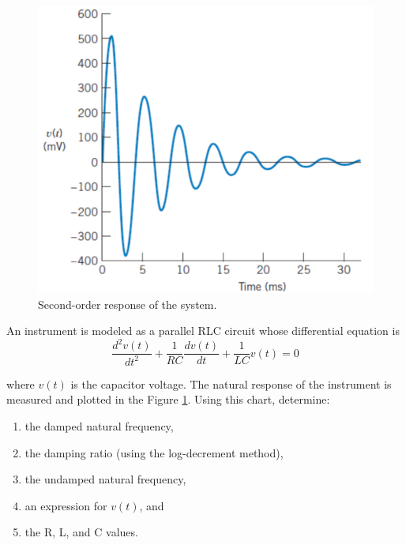 \documentclass[a4paper,11pt]{book}
\begin{document}
\begin{question}[subtitle=Midterm 2017]
\begin{figure}[h!]\label{fig:problem1}
\centering
  \includegraphics[width=0.7\linewidth]{problem1}
  \caption{Second-order response of the system.} 
\end{figure}
An instrument is modeled as a parallel RLC circuit whose differential equation is 
\begin{equation*}
\frac{d^2 v(t)}{dt^2} + \frac{1}{RC}\frac{dv(t)}{dt} + \frac{1}{LC}v(t) = 0
\end{equation*}

where $v(t)$ is the capacitor voltage.
The natural response of the instrument is measured
and plotted in the Figure \ref{fig:problem1}. Using this chart, determine:
\begin{enumerate}
\item the damped natural frequency,
\item the damping ratio (using the log-decrement method),
\item the undamped natural frequency,
\item an expression for $v(t)$, and
\item the R, L, and C values.
\end{enumerate}

\examspace*{50em}

\end{question}
\begin{solution}
\end{solution}
\end{document}
